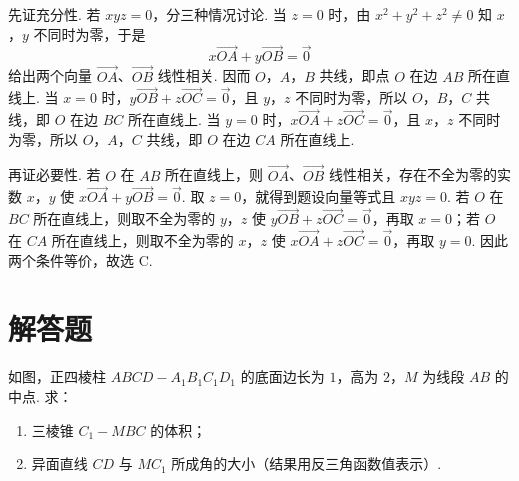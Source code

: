 \begin{solution}
先证充分性. 若 \(xyz=0\)，分三种情况讨论. 当 \(z=0\) 时，由 \(x^2+y^2+z^2\ne0\) 知 \(x\)，\(y\) 不同时为零，于是
\[
x\overrightarrow{OA}+y\overrightarrow{OB}=\overrightarrow{0}
\]
给出两个向量 \(\overrightarrow{OA}\)、\(\overrightarrow{OB}\) 线性相关. 因而 \(O\)，\(A\)，\(B\) 共线，即点 \(O\) 在边 \(AB\) 所在直线上. 当 \(x=0\) 时，\(y\overrightarrow{OB}+z\overrightarrow{OC}=\overrightarrow{0}\)，且 \(y\)，\(z\) 不同时为零，所以 \(O\)，\(B\)，\(C\) 共线，即 \(O\) 在边 \(BC\) 所在直线上. 当 \(y=0\) 时，\(x\overrightarrow{OA}+z\overrightarrow{OC}=\overrightarrow{0}\)，且 \(x\)，\(z\) 不同时为零，所以 \(O\)，\(A\)，\(C\) 共线，即 \(O\) 在边 \(CA\) 所在直线上.

再证必要性. 若 \(O\) 在 \(AB\) 所在直线上，则 \(\overrightarrow{OA}\)、\(\overrightarrow{OB}\) 线性相关，存在不全为零的实数 \(x\)，\(y\) 使 \(x\overrightarrow{OA}+y\overrightarrow{OB}=\overrightarrow{0}\). 取 \(z=0\)，就得到题设向量等式且 \(xyz=0\). 若 \(O\) 在 \(BC\) 所在直线上，则取不全为零的 \(y\)，\(z\) 使 \(y\overrightarrow{OB}+z\overrightarrow{OC}=\overrightarrow{0}\)，再取 \(x=0\)；若 \(O\) 在 \(CA\) 所在直线上，则取不全为零的 \(x\)，\(z\) 使 \(x\overrightarrow{OA}+z\overrightarrow{OC}=\overrightarrow{0}\)，再取 \(y=0\). 因此两个条件等价，故选 C.
\end{solution}

\section{解答题}

\begin{problem}
如图，正四棱柱 \(ABCD-A_1B_1C_1D_1\) 的底面边长为 \(1\)，高为 \(2\)，\(M\) 为线段 \(AB\) 的中点. 求：

\begin{enumerate}
\item 三棱锥 \(C_1-MBC\) 的体积；
\item 异面直线 \(CD\) 与 \(MC_1\) 所成角的大小（结果用反三角函数值表示）.
\end{enumerate}

\end{problem}

